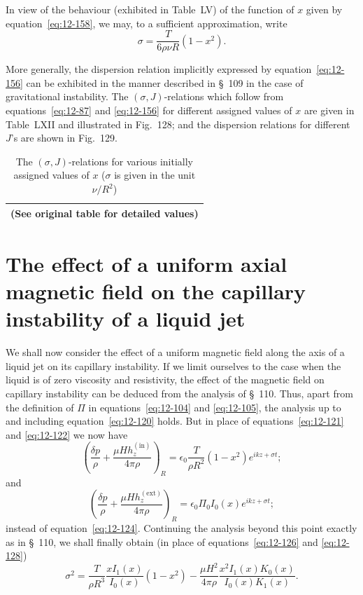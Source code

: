 In view of the behaviour (exhibited in Table~LV) of the function of $x$ given by equation~\eqref{eq:12-158}, we may, to a sufficient approximation, write
\begin{equation}
\label{eq:12-159}
\sigma = \frac{T}{6\rho\nu R}(1-x^2).
\end{equation}

More generally, the dispersion relation implicitly expressed by equation~\eqref{eq:12-156} can be exhibited in the manner described in \S~109 in the case of gravitational instability. The $(\sigma, J)$-relations which follow from equations~\eqref{eq:12-87} and \eqref{eq:12-156} for different assigned values of $x$ are given in Table~LXII and illustrated in Fig.~128; and the dispersion relations for different $J$'s are shown in Fig.~129.

\begin{table}[ht]
\centering
\caption{The $(\sigma, J)$-relations for various initially assigned values of $x$ ($\sigma$ is given in the unit $\nu/R^2$)}
\label{tab:LXII}
\begin{tabular}{cccccccccc}
\hline
\multicolumn{10}{c}{(See original table for detailed values)} \\
\hline
\end{tabular}
\end{table}

\section{The effect of a uniform axial magnetic field on the capillary instability of a liquid jet}\label{sec:112}
We shall now consider the effect of a uniform magnetic field along the axis of a liquid jet on its capillary instability. If we limit ourselves to the case when the liquid is of zero viscosity and resistivity, the effect of the magnetic field on capillary instability can be deduced from the analysis of \S~110. Thus, apart from the definition of $\Pi$ in equations~\eqref{eq:12-104} and \eqref{eq:12-105}, the analysis up to and including equation~\eqref{eq:12-120} holds. But in place of equations~\eqref{eq:12-121} and \eqref{eq:12-122} we now have
\begin{equation}
\label{eq:12-160}
\left(\frac{\delta p}{\rho} + \frac{\mu H h_z^{(\mathrm{in})}}{4\pi\rho}\right)_R = \epsilon_0\frac{T}{\rho R^2}(1-x^2)e^{ikz+\sigma t};
\end{equation}
and
\begin{equation}
\label{eq:12-161}
\left(\frac{\delta p}{\rho} + \frac{\mu H h_z^{(\mathrm{ext})}}{4\pi\rho}\right)_R = \epsilon_0 \Pi_0 I_0(x) e^{ikz+\sigma t};
\end{equation}
instead of equation~\eqref{eq:12-124}. Continuing the analysis beyond this point exactly as in \S~110, we shall finally obtain (in place of equations~\eqref{eq:12-126} and \eqref{eq:12-128})
\begin{equation}
\label{eq:12-162}
\sigma^2 = \frac{T}{\rho R^3}\frac{xI_1(x)}{I_0(x)}(1-x^2) - \frac{\mu H^2}{4\pi\rho}\frac{x^2 I_1(x)K_0(x)}{I_0(x)K_1(x)}.
\end{equation}

